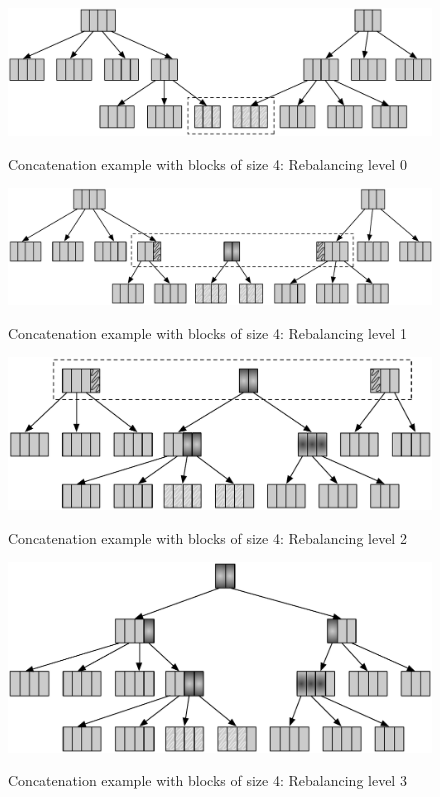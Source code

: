 \begin{figure}[h!]
  \centering
  \includegraphics[width=\textwidth]{Figures/Concat0.pdf}
  \label{Concat0Benchmarks}
  \caption{Concatenation example with blocks of size 4: Rebalancing level 0}
\end{figure}

\begin{figure}[h!]
  \centering
  \includegraphics[width=\textwidth]{Figures/Concat1.pdf}
  \label{Concat1Benchmarks}
  \caption{Concatenation example with blocks of size 4: Rebalancing level 1}
\end{figure}

\begin{figure}[h!]
  \centering
  \includegraphics[width=\textwidth]{Figures/Concat2.pdf}
  \label{Concat2Benchmarks}
  \caption{Concatenation example with blocks of size 4: Rebalancing level 2}
\end{figure}

\begin{figure}[h!]
  \centering
  \includegraphics[width=\textwidth]{Figures/Concat3.pdf}
  \label{Concat3Benchmarks}
  \caption{Concatenation example with blocks of size 4: Rebalancing level 3}
\end{figure}


